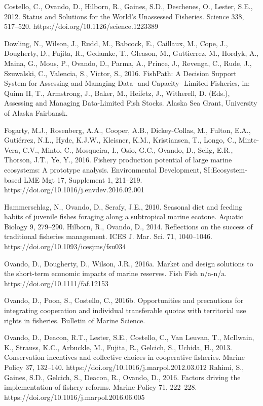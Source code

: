 \documentclass[twoside,12pt,final]{ucthesis-CA2012}
\begin{document}
\begin{ucfrontmatter}
\begin{vitae}
Costello, C., Ovando, D., Hilborn, R., Gaines, S.D., Deschenes, O., Lester, S.E., 2012. Status and Solutions for the World’s Unassessed Fisheries. Science 338, 517–520. https://doi.org/10.1126/science.1223389

Dowling, N., Wilson, J., Rudd, M., Babcock, E., Caillaux, M., Cope, J., Dougherty, D., Fujita, R., Gedamke, T., Gleason, M., Guttierrez, M., Hordyk, A., Maina, G., Mous, P., Ovando, D., Parma, A., Prince, J., Revenga, C., Rude, J., Szuwalski, C., Valencia, S., Victor, S., 2016. FishPath: A Decision Support System for Assessing and Managing Data- and Capacity- Limited Fisheries, in: Quinn II, T., Armstrong, J., Baker, M., Heifetz, J., Witherell, D. (Eds.), Assessing and Managing Data-Limited Fish Stocks. Alaska Sea Grant, University of Alaska Fairbansk.

Fogarty, M.J., Rosenberg, A.A., Cooper, A.B., Dickey-Collas, M., Fulton, E.A., Gutiérrez, N.L., Hyde, K.J.W., Kleisner, K.M., Kristiansen, T., Longo, C., Minte-Vera, C.V., Minto, C., Mosqueira, I., Osio, G.C., Ovando, D., Selig, E.R., Thorson, J.T., Ye, Y., 2016. Fishery production potential of large marine ecosystems: A prototype analysis. Environmental Development, SI:Ecosystem-based LME Mgt 17, Supplement 1, 211–219. https://doi.org/10.1016/j.envdev.2016.02.001

Hammerschlag, N., Ovando, D., Serafy, J.E., 2010. Seasonal diet and feeding habits of juvenile fishes foraging along a subtropical marine ecotone. Aquatic Biology 9, 279–290.
Hilborn, R., Ovando, D., 2014. Reflections on the success of traditional fisheries management. ICES J. Mar. Sci. 71, 1040–1046. https://doi.org/10.1093/icesjms/fsu034

Ovando, D., Dougherty, D., Wilson, J.R., 2016a. Market and design solutions to the short-term economic impacts of marine reserves. Fish Fish n/a-n/a. https://doi.org/10.1111/faf.12153

Ovando, D., Poon, S., Costello, C., 2016b. Opportunities and precautions for integrating cooperation and individual transferable quotas with territorial use rights in fisheries. Bulletin of Marine Science.

Ovando, D., Deacon, R.T., Lester, S.E., Costello, C., Van Leuvan, T., McIlwain, K., Strauss, K.C., Arbuckle, M., Fujita, R., Gelcich, S., Uchida, H., 2013. Conservation incentives and collective choices in cooperative fisheries. Marine Policy 37, 132–140. https://doi.org/10.1016/j.marpol.2012.03.012
Rahimi, S., Gaines, S.D., Gelcich, S., Deacon, R., Ovando, D., 2016. Factors driving the implementation of fishery reforms. Marine Policy 71, 222–228. https://doi.org/10.1016/j.marpol.2016.06.005


\end{vitae}
\end{ucfrontmatter}
\end{document}
